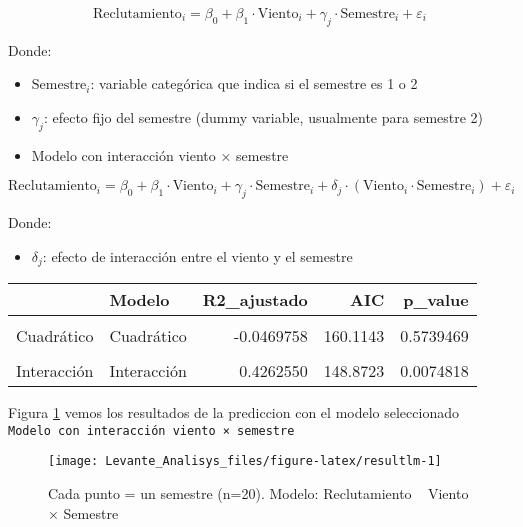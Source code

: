 \documentclass[
]{article}
\providecommand{\tightlist}{%
  \setlength{\itemsep}{0pt}\setlength{\parskip}{0pt}}
\begin{document}
\[
\text{Reclutamiento}_i = \beta_0 + \beta_1 \cdot \text{Viento}_i + \gamma_j \cdot \text{Semestre}_i + \varepsilon_i
\]

Donde:

\begin{itemize}
\item
  \(\text{Semestre}_i\): variable categórica que indica si el semestre es 1 o 2
\item
  \(\gamma_j\): efecto fijo del semestre (dummy variable, usualmente para semestre 2)
\item
  Modelo con interacción viento × semestre
\end{itemize}

\[
\text{Reclutamiento}_i = \beta_0 + \beta_1 \cdot \text{Viento}_i + \gamma_j \cdot \text{Semestre}_i + \delta_j \cdot (\text{Viento}_i \cdot \text{Semestre}_i) + \varepsilon_i
\]

Donde:

\begin{itemize}
\tightlist
\item
  \(\delta_j\): efecto de interacción entre el viento y el semestre
\end{itemize}

\begin{table}[!h]
\centering
\begin{tabular}[t]{l|l|r|r|r}
\hline
  & Modelo & R2\_ajustado & AIC & p\_value\\
\hline
\cellcolor{gray!10}{Lineal} & \cellcolor{gray!10}{Lineal} & \cellcolor{gray!10}{-0.0554818} & \cellcolor{gray!10}{159.4193} & \cellcolor{gray!10}{0.9720995}\\
\hline
Cuadrático & Cuadrático & -0.0469758 & 160.1143 & 0.5739469\\
\hline
\cellcolor{gray!10}{Con semestre} & \cellcolor{gray!10}{Con semestre} & \cellcolor{gray!10}{0.3456430} & \cellcolor{gray!10}{150.7142} & \cellcolor{gray!10}{0.0105642}\\
\hline
Interacción & Interacción & 0.4262550 & 148.8723 & 0.0074818\\
\hline
\end{tabular}
\end{table}

\newpage

Figura \ref{fig:resultlm} vemos los resultados de la prediccion con el modelo seleccionado \texttt{Modelo\ con\ interacción\ viento\ ×\ semestre}

\begin{figure}[ht!]

{\centering \texttt{[image: Levante\_Analisys\_files/figure-latex/resultlm-1]} 

}

\caption{Cada punto = un semestre (n=20). Modelo: Reclutamiento ~ Viento × Semestre}\label{fig:resultlm}
\end{figure}
\end{document}

